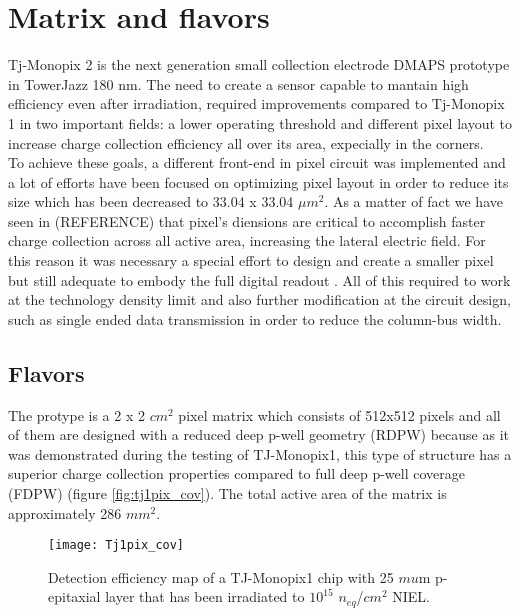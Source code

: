 \section{Matrix and flavors}


Tj-Monopix 2 is the next generation small collection electrode DMAPS prototype in TowerJazz 180 nm. The need to create a sensor capable to mantain high efficiency even after irradiation, required improvements compared to Tj-Monopix 1 in two important fields: a lower operating threshold and different pixel layout to increase charge collection efficiency all over its area, expecially in the corners.\\

To achieve these goals, a different front-end in pixel circuit was implemented and a lot of efforts have been focused on optimizing pixel layout in order to reduce its size which has been decreased to 33.04 x 33.04 $\mu m^{2}$. As a matter of fact we have seen in (REFERENCE) that pixel's diensions are critical to accomplish faster charge collection across all active area, increasing the lateral electric field. For this reason it was necessary a special effort to design and create a smaller pixel but still adequate to embody the full digital readout . All of this required to work at the technology density limit and also further modification at the circuit design, such as single ended data transmission in order to reduce the column-bus width.



\subsection{Flavors}

The protype is a 2 x 2 $cm^{2}$ pixel matrix which consists of 512x512 pixels and all of them are designed with a reduced deep p-well geometry (RDPW) because as it was demonstrated during the testing of TJ-Monopix1, this type of structure has a superior charge collection properties compared to full deep p-well coverage (FDPW) (figure \vref{fig:tj1pix_cov}). The total active area of the matrix is approximately 286 $mm^{2}$. 

\begin{figure}[h!]
\centering
\texttt{[image: Tj1pix\_cov]}
\caption{Detection efficiency map of a TJ-Monopix1 chip with 25 $mu$m p-epitaxial layer that has been irradiated to $10^{15}$ $n_{\textit{eq}}$/$cm^{2}$ NIEL.}
\label{fig:tj1pix_cov}
\end{figure}

